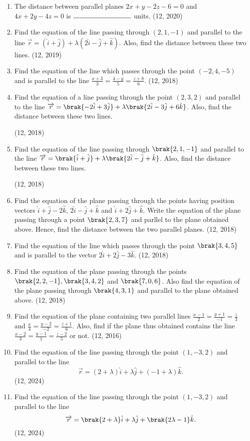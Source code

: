 \begin{enumerate}[label=\thesubsection.\arabic*, ref=\thesubsection.\theenumi]
\item The distance between parallel planes $2x + y - 2z - 6 = 0$ and $4x + 2y - 4z = 0$ is $\rule{3cm}{0.15mm}$ units.
\hfill (12, 2020)
	\item Find the equation of the line passing through $(2, 1, -1)$ and parallel to the line $\overrightarrow{r} = (\hat{i} + \hat{j}) + \lambda (2\hat{i} - \hat{j} + \hat{k})$. Also, find the distance between these two lines. \hfill (12, 2019)
\item Find the equation of the line which passes through the point $(-2, 4, -5)$ and is parallel to the line 
	$
\frac{x + 3}{3} = \frac{4 - y}{5} = \frac{z + 8}{6}.
$
\hfill (12, 2018)
\item Find the equation of a line passing through the point $(2,3,2)$ and parallel to the line $\overrightarrow{r} = \brak{-2\hat{i}+3\hat{j}}+\lambda\brak{2\hat{i}-3\hat{j}+6\hat{k}}$. Also, find the distance between these two lines.

\hfill (12, 2018) 
\item  Find the equation of the line passing through $\brak{2, 1, -1}$ and parallel to the line $\overrightarrow{r}=\brak{\hat{i}+\hat{j}}+\lambda\brak{2\hat{i}-\hat{j}+\hat{k}}$. Also, find the distance between these two lines.

\hfill (12, 2018) 
\item Find the equation of the plane passing through the points having position vectors $\hat{i} + \hat{ j} - 2\hat{k}$, $2\hat{i}-\hat{j} + \hat{k}$ and $\hat{i} + 2\hat{j} + \hat{k}$. Write the equation of the plane passing through a point $\brak{2,3,7}$ and parllel to the plane obtained above. Hence, find the distance between the two parallel planes.
\hfill (12, 2018) 
\item Find the equation of the line which passes through the point $\brak{3,4,5}$ and is parallel to the vector $2\hat{i}+2\hat{j}-3\hat{k}$.
\hfill (12, 2018) 
\item Find the equation of the plane passing through the points $\brak{2,2,-1},\brak{3,4,2}$ and $\brak{7,0,6}$. Also find the equation of the plane passing through $\brak{4,3,1}$ and parallel to the plane obtained above.
\hfill (12, 2018) 
\item Find the equation of the plane containing two parallel lines
      $\frac{x-1}{2} = \frac{y+1}{-1} = \frac{z}{3}$ and $\frac{x}{4} = \frac{y-2}{-2} = \frac{z+1}{6}$.
      Also, find if the plane thus obtained contains the line
      $\frac{x-2}{3} =\frac{y-1}{1} = \frac{z-2}{5}$ or not. \hfill (12, 2016)
    \item Find the equation of the line passing through the point $(1, -3, 2)$ and parallel to the line
	    $$
         \vec{r} = (2 + \lambda)\hat{i} + \lambda \hat{j} + (-1 + \lambda)\hat{k}.
	 $$	\hfill (12, 2024)
    \item Find the equation of the line passing through the point $(1, -3, 2)$ and parallel to the line
	$$\overrightarrow{r} = \brak{2+\lambda} \hat{i} + \lambda \hat{j}    + \brak{2\lambda-1} \hat{k}.$$ 
		\hfill (12, 2024)

\end{enumerate}
